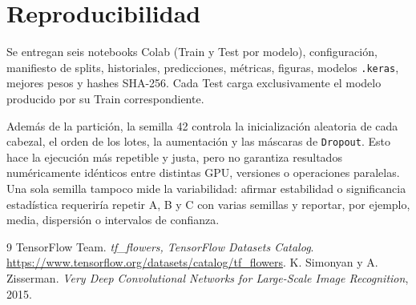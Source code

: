 \documentclass[11pt,letterpaper]{article}
\begin{document}
\section{Reproducibilidad}
Se entregan seis notebooks Colab (Train y Test por modelo), configuración,
manifiesto de splits, historiales, predicciones, métricas, figuras, modelos
\texttt{.keras}, mejores pesos y hashes SHA-256. Cada Test carga exclusivamente
el modelo producido por su Train correspondiente.

Además de la partición, la semilla 42 controla la inicialización aleatoria de
cada cabezal, el orden de los lotes, la aumentación y las máscaras de
\texttt{Dropout}. Esto hace la ejecución más repetible y justa, pero no
garantiza resultados numéricamente idénticos entre distintas GPU, versiones o
operaciones paralelas. Una sola semilla tampoco mide la variabilidad: afirmar
estabilidad o significancia estadística requeriría repetir A, B y C con varias
semillas y reportar, por ejemplo, media, dispersión o intervalos de confianza.

\begin{thebibliography}{9}
TensorFlow Team. \emph{tf\_flowers, TensorFlow Datasets Catalog}.
\url{https://www.tensorflow.org/datasets/catalog/tf_flowers}.
K. Simonyan y A. Zisserman. \emph{Very Deep Convolutional Networks for
Large-Scale Image Recognition}, 2015.
\end{thebibliography}
\end{document}
